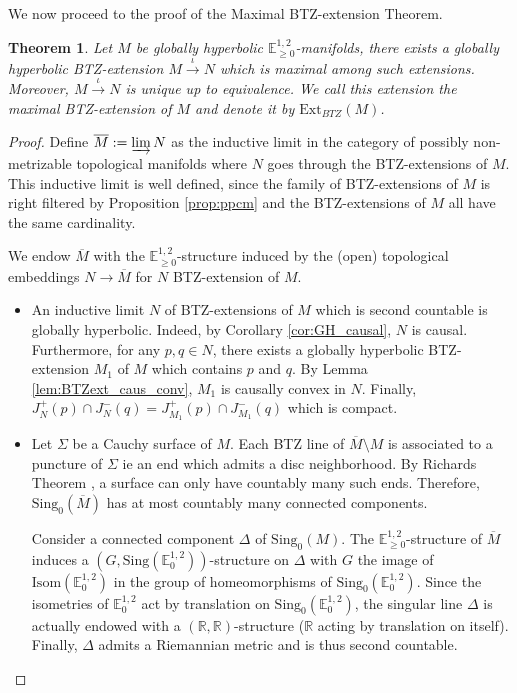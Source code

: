 \documentclass[a4paper,12pt]{article}
\def\isom{Isom}
\def\sing{\mathrm{Sing}}
\def\RR{\mathbb{R}}
\newcommand{\mass}[1]{{\mathbb E}^{1,2}_{#1}}
\def\isom{\mathrm{Isom}}
\newtheorem{theo}{Theorem}    %
\begin{document}
We now proceed to the proof of the Maximal BTZ-extension Theorem.
\setcounter{theo}{1}
 \begin{theo}\label{btzthm:BTZ_ext}\label{theo:BTZ_ext} Let $M$ be globally hyperbolic $\mass{\geq 0}$-manifolds, there exists a globally hyperbolic BTZ-extension $M\xrightarrow{\iota} N$ which is maximal among such extensions. Moreover, $M\xrightarrow{\iota}N$ is unique up to equivalence. We  call this extension
the maximal BTZ-extension of $M$ and denote it by 
  $\mathrm{Ext}_{BTZ}(M)$.   
\end{theo}

		\begin{proof}
			Define $\overline M:= \varinjlim N$ as the inductive limit \cite{MR1712872} in the category of possibly non-metrizable topological manifolds \cite{MR3244277} where $N$ goes through the BTZ-extensions of $M$. This inductive limit is well defined, since the family of BTZ-extensions of $M$ is right filtered by Proposition \ref{prop:ppcm} and the BTZ-extensions of $M$ all have the same cardinality. 
			
			We endow $\overline M$ with the $\mass{\geq0}$-structure induced by the (open) topological embeddings $N\rightarrow \overline M$ for $N$ BTZ-extension of $M$.
			
			\begin{itemize}
\item An inductive limit $N$ of BTZ-extensions of $M$ which is second countable is globally hyperbolic. Indeed, by Corollary \ref{cor:GH_causal}, $N$ is causal. Furthermore, for any $p,q \in N$, there exists a globally hyperbolic BTZ-extension $M_1$ of $M$  which contains $p$ and $q$. By Lemma \ref{lem:BTZext_caus_conv},  $M_1$ is causally convex in $N$. Finally, $J^+_{N}(p)\cap J^-_{N}(q) = J^+_{M_1}(p)\cap J^-_{M_1}(q) $ which is compact.			
			
				\item
					Let $\Sigma$ be a Cauchy surface of $M$. Each BTZ line of $\overline M\setminus M$ is associated to a puncture of $\Sigma$ ie an end which admits a disc neighborhood. By Richards Theorem \cite{MR143186}, a surface can only have countably many such ends. Therefore, $\sing_0(\overline M)$ has at most countably many connected components.		
				
				 Consider a connected component $\Delta$ of $\sing_0(M)$.  The $\mass{\geq 0}$-structure of $\overline M$ induces a $\left(G ,\sing(\mass{0}) \right)$-structure on $\Delta$ with $G$ the image of $\isom(\mass{0})$ in the group of homeomorphisms of $\sing_0(\mass{0})$. Since the isometries of $\mass{0}$ act by translation on $\sing_0(\mass{0})$, the singular line $\Delta$ is actually endowed with a $(\RR,\RR)$-structure ($\RR$ acting by translation on itself). 
				 Finally, $\Delta$ admits a Riemannian metric and is thus second countable. 
				 

\end{itemize}
\end{proof}
\end{document}
